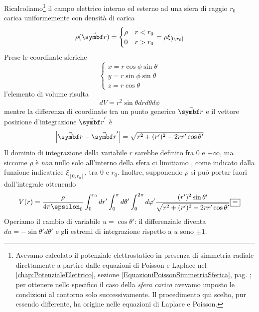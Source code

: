 \begin{examplewt}
	Ricalcoliamo\footnote{Avevamo calcolato il potenziale elettrostatico in presenza di simmetria radiale direttamente a partire dalle equazioni di Poisson e Laplace nel \autoref{chap:PotenzialeElettrico}, sezione \ref{EquazioniPoissonSimmetriaSferica}, pag. \pageref{EquazioniPoissonSimmetriaSferica}; per ottenere nello specifico il caso della \textit{sfera carica}  avevamo imposto le condizioni al contorno solo successivamente. Il procedimento qui scelto, pur essendo differente, ha origine nelle equazioni di Laplace e Poisson.} il campo elettrico interno ed esterno ad una sfera di raggio $r_0$ carica uniformemente con densità di carica
	\begin{equation*}
		\rho(\vba r)=
		\begin{cases}
			\rho & r<r_0\\
			0 & r>r_0
			\end{cases}=\rho\xi_{[0,r_0]}
	\end{equation*}
	Prese le coordinate sferiche
	\begin{equation*}
		\begin{cases}
			x=r\cos\phi\sin\theta\\
			y=r\sin\phi\sin\theta\\
			z=r\cos\theta
		\end{cases}
	\end{equation*}
	l'elemento di volume risulta
	\begin{equation*}
		dV=r^2\sin\theta drd\theta d\phi
	\end{equation*}
	mentre la differenza di coordinate tra un punto generico $\vba{r}$ e il vettore posizione d'integrazione  $\vba{r}'$ è
	\begin{equation*}
		\abs{\vba r-\vba r'}=\sqrt{r^2+(r')^2-2rr'\cos\theta '}
	\end{equation*}
	Il dominio di integrazione della variabile $r$ sarebbe definito fra $0$ e $+\infty$, ma siccome $\rho$ è \textit{non} nullo solo all'interno della sfera ci limitiamo , come indicato dalla funzione indicatrice $\xi_{[0,r_0]}$, tra $0$ e $r_0$. Inoltre, supponendo $\rho$ si può portar fuori dall'integrale ottenendo
	\begin{equation*}
		V(r)=\frac{\rho}{4\pi\epsilon_0}\int^{r_0}_0dr' \int^\pi_0 d\theta' \int^{2\pi}_0 d\phi' \frac{(r')^2 \sin\theta '}{\sqrt{r^2+(r')^2 -2rr'\cos\theta '}}\squarequal	
	\end{equation*}
	Operiamo il cambio di variabile $u=\cos\theta'$: il differenziale diventa $du=-\sin\theta'd\theta'$ e gli estremi di integrazione rispetto a $u$ sono $\pm 1$.

\end{examplewt}
